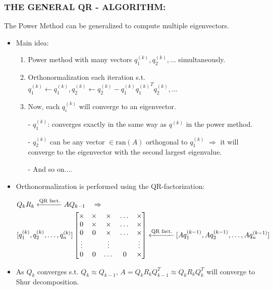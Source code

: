 \documentclass[a4paper,8pt]{beamer} %
\newcommand{\ran}[1]{\text{ran}({#1})}
\newcommand{\smatrix}[1]{\left[\begin{matrix} #1 \end{matrix}\right]}
\begin{document}
\begin{frame} %
\frametitle{THE GENERAL QR - ALGORITHM:}
The Power Method can be generalized to compute multiple eigenvectors.
%
%
\begin{itemize}
	\item <1-> Main idea:
	\begin{enumerate}
		\item
		Power method with many vectors $q^{(k)}_1,q^{(k)}_2,\dots$ simultaneously. 
		\item	
		Orthonormalization each iteration s.t. 
		$q^{(k)}_1\gets q^{(k)}_1, q^{(k)}_2 \gets q^{(k)}_2 - q^{(k)}_1 {q^{(k)}_1}^Tq^{(k)}_2, \dots$
		\item Now, each $q_i^{(k)}$ will converge to an eigenvector.
		\item[-] 
		$q_1^{(k)}$: converges exactly in the same way as $q^{(k)}$ in the power method.
		\item[-]
		$q_2^{(k)}$ can be any vector $\in\ran{A}$ orthogonal to $q_1^{(k)}$
		$\Rightarrow$ it will converge to the eigenvector with the second largest eigenvalue. 
		\item[-]
		And so on....
	\end{enumerate}
	\item <2-> Orthonormalization is performed using the QR-factorization:
	\begin{footnotesize}
		\begin{align}
		& Q_{k} R_k \xleftarrow{\text{QR fact.}} A Q_{k-1} \quad\Rightarrow \notag \\
		& [q^{(k)}_1,q^{(k)}_2,\dots, q_n^{(k)}] 
		\smatrix{\times & \times & \times & \dots & \times \\ 
				0 		& \times & \times & \dots & \times \\
				0 		& 0 	& \times & \dots & \times \\
				\vdots  & 		& \vdots & 	& 	\vdots \\
				0 & 0 & \dots & 0 & \times }
		\xleftarrow{\text{QR fact.}} [ Aq^{(k-1)}_1, Aq^{(k-1)}_2,\dots, Aq_n^{(k-1)}] 
		\label{eq:qr}
		\end{align}
	\end{footnotesize}
\item <3-> As $Q_k$ converges s.t. $Q_k\approx Q_{k-1}$, $A = Q_kR_kQ_{k-1}^T \approx Q_k R_k Q_k^T$
will converge to Shur decomposition.
\end{itemize}
\end{frame} %
\end{document}
